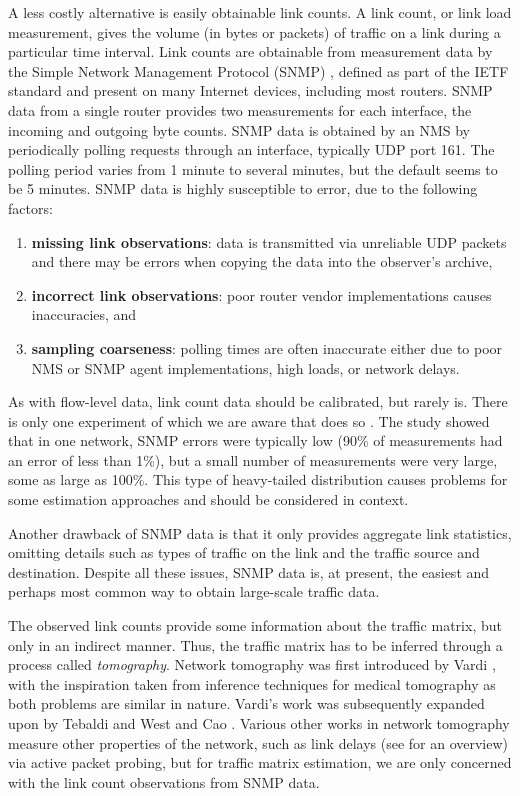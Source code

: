A less costly alternative is easily obtainable link counts. A link
count, or link load measurement, gives the volume (in bytes or
packets) of traffic on a link during a particular time interval.  Link
counts are obtainable from measurement data by the Simple Network
Management Protocol (SNMP) \cite{SNMP}, defined as part of the IETF
standard and present on many Internet devices, including most
routers. SNMP data from a single router provides two measurements for
each interface, the incoming and outgoing byte counts. SNMP data is
obtained by an NMS by periodically polling requests through an
interface, typically UDP port 161. The polling period varies from 1
minute to several minutes, but the default seems to be 5 minutes. SNMP
data is highly susceptible to error, due to the following factors:
\begin{enumerate}
\item \textbf{missing link observations}: data is transmitted via
  unreliable UDP packets and there may be errors when copying the data
  into the observer's archive, 

\item \textbf{incorrect link observations}: poor router vendor
  implementations causes inaccuracies, and

\item \textbf{sampling coarseness}: polling times are often inaccurate
  either due to poor NMS or SNMP agent implementations, high loads, or
  network delays.

\end{enumerate}
As with flow-level data, link count data should be calibrated, but
rarely is. There is only one experiment of which we are aware that
does so \cite{roughan10:_case_accur_snmp_measur}. The study showed
that in one network, SNMP errors were typically low (90\% of
measurements had an error of less than 1\%), but a small number of
measurements were very large, some as large as 100\%. This type of
heavy-tailed distribution causes problems for some estimation
approaches and should be considered in context.

Another drawback of SNMP data is that it only provides aggregate link
statistics, omitting details such as types of traffic on the link and
the traffic source and destination. Despite all these issues, SNMP
data is, at present, the easiest and perhaps most common way to obtain
large-scale traffic data.

The observed link counts provide some information about the traffic
matrix, but only in an indirect manner. Thus, the traffic matrix has
to be inferred through a process called \textit{tomography}. 
Network tomography was first introduced by Vardi
\cite{Vardi96Tomo}, with the inspiration taken from inference
techniques for medical tomography as both problems are similar in
nature. Vardi's work was subsequently expanded upon by Tebaldi and
West \cite{Tebaldi98Tomo} and Cao \etal\cite{Cao00Tomo}. Various
other works in network tomography measure other properties of the
network, such as link delays (see
\cite{tomo_CCLNY_2004,tomo_CHNY_2002} for an overview) via active
packet probing, but for traffic matrix estimation, we are only
concerned with the link count observations from SNMP data.

